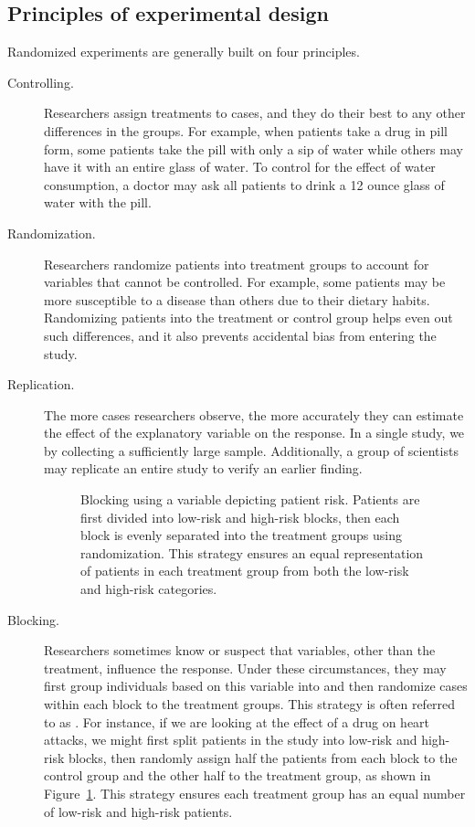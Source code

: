 \subsection{Principles of experimental design}
\label{experimentalDesignPrinciples}

\noindent{}Randomized experiments are generally built on four principles.

\begin{description}
\item[Controlling.] Researchers assign treatments to cases, and they do their best to  any other differences in the groups. For example, when patients take a drug in pill form, some patients take the pill with only a sip of water while others may have it with an entire glass of water. To control for the effect of water consumption, a doctor may ask all patients to drink a 12 ounce glass of water with the pill.
\item[Randomization.] Researchers randomize patients into treatment groups to account for variables that cannot be controlled. For example, some patients may be more susceptible to a disease than others due to their dietary habits. Randomizing patients into the treatment or control group helps even out such differences, and it also prevents accidental bias from entering the study.
\item[Replication.] The more cases researchers observe, the more accurately they can estimate the effect of the explanatory variable on the response. In a single study, we  by collecting a sufficiently large sample. Additionally, a group of scientists may replicate an entire study to verify an earlier finding.

\begin{figure}
  \centering
  \caption{Blocking using a variable depicting patient risk.
      Patients are first divided into low-risk and high-risk
      blocks, then each block is evenly separated into the
      treatment groups using randomization.
      This strategy ensures an equal representation of patients
      in each treatment group from both the low-risk and high-risk
      categories.}
  \label{figureShowingBlocking}
\end{figure}

\item[Blocking.] Researchers sometimes know or suspect that variables, other than the treatment, influence the response. Under these circumstances, they may first group individuals based on this variable into  and then randomize cases within each block to the treatment groups. This strategy is often referred to as . For instance, if we are looking at the effect of a drug on heart attacks, we might first split patients in the study into low-risk and high-risk blocks, then randomly assign half the patients from each block to the control group and the other half to the treatment group, as shown in Figure~\ref{figureShowingBlocking}. This strategy ensures each treatment group has an equal number of low-risk and high-risk patients.
\end{description}

